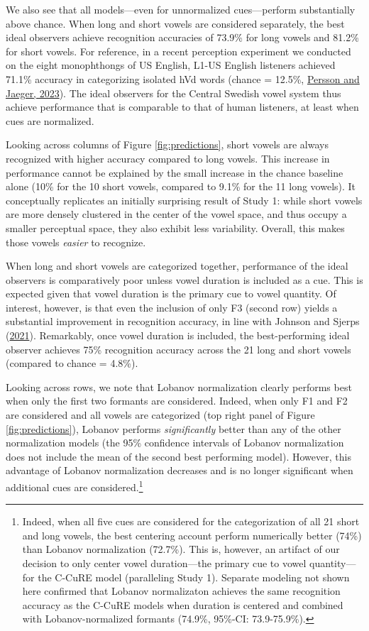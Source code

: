 \documentclass[utf8]{frontiersSCNS}
\begin{document}
We also see that all models---even for unnormalized cues---perform substantially above chance. When long and short vowels are considered separately, the best ideal observers achieve recognition accuracies of 73.9\% for long vowels and 81.2\% for short vowels. For reference, in a recent perception experiment we conducted on the eight monophthongs of US English, L1-US English listeners achieved 71.1\% accuracy in categorizing isolated hVd words (chance = 12.5\%, \protect\hyperlink{ref-persson-jaeger2023}{Persson and Jaeger, 2023}). The ideal observers for the Central Swedish vowel system thus achieve performance that is comparable to that of human listeners, at least when cues are normalized.

Looking across columns of Figure \ref{fig:predictions}, short vowels are always recognized with higher accuracy compared to long vowels. This increase in performance cannot be explained by the small increase in the chance baseline alone (10\% for the 10 short vowels, compared to 9.1\% for the 11 long vowels). It conceptually replicates an initially surprising result of Study 1: while short vowels are more densely clustered in the center of the vowel space, and thus occupy a smaller perceptual space, they also exhibit less variability. Overall, this makes those vowels \emph{easier} to recognize.

When long and short vowels are categorized together, performance of the ideal observers is comparatively poor unless vowel duration is included as a cue. This is expected given that vowel duration is the primary cue to vowel quantity. Of interest, however, is that even the inclusion of only F3 (second row) yields a substantial improvement in recognition accuracy, in line with Johnson and Sjerps (\protect\hyperlink{ref-johnson-sjerps2021}{2021}). Remarkably, once vowel duration is included, the best-performing ideal observer achieves 75\% recognition accuracy across the 21 long and short vowels (compared to chance = 4.8\%).

Looking across rows, we note that Lobanov normalization clearly performs best when only the first two formants are considered. Indeed, when only F1 and F2 are considered and all vowels are categorized (top right panel of Figure \ref{fig:predictions}), Lobanov performs \emph{significantly} better than any of the other normalization models (the 95\% confidence intervals of Lobanov normalization does not include the mean of the second best performing model). However, this advantage of Lobanov normalization decreases and is no longer significant when additional cues are considered.\footnote{\label{fn:best-performing} Indeed, when all five cues are considered for the categorization of all 21 short and long vowels, the best centering account perform numerically better (74\%) than Lobanov normalization (72.7\%). This is, however, an artifact of our decision to only center vowel duration---the primary cue to vowel quantity---for the C-CuRE model (paralleling Study 1). Separate modeling not shown here confirmed that Lobanov normalizaton achieves the same recognition accuracy as the C-CuRE models when duration is centered and combined with Lobanov-normalized formants (74.9\%, 95\%-CI: 73.9-75.9\%).}
\end{document}
